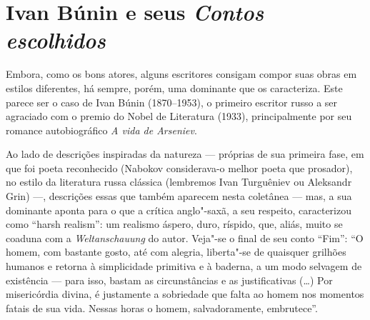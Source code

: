 \chapter{Ivan Búnin e seus \emph{Contos escolhidos}}

Embora, como os bons atores, alguns escritores consigam compor suas obras em estilos diferentes, há sempre, porém, uma dominante que os caracteriza. Este parece ser o caso de Ivan Búnin (1870--1953), o primeiro escritor russo a ser agraciado com o premio do Nobel de Literatura (1933), principalmente por seu romance autobiográfico \emph{A vida de Arseniev}. 

Ao lado de descrições inspiradas da natureza --- próprias de sua primeira fase, em que foi poeta reconhecido (Nabokov considerava-o melhor poeta que prosador), no estilo da literatura russa clássica (lembremos Ivan Turguêniev ou  Aleksandr Grin) ---, descrições  essas  que também aparecem nesta coletânea  --- mas, a sua dominante aponta para o que a crítica anglo"-saxã, a seu respeito, caracterizou como ``harsh realism'': um realismo áspero, duro, ríspido, que, aliás, muito se coaduna com a \emph{Weltanschauung} do autor. Veja"-se o final de seu conto ``Fim'': ``O homem, com bastante gosto, até com alegria, liberta"-se de quaisquer grilhões humanos e retorna à simplicidade primitiva e à baderna, a um modo selvagem de existência --- para isso, bastam as circunstâncias e as justificativas (\ldots{}) Por misericórdia divina, é justamente a sobriedade que falta ao homem nos momentos fatais de sua vida. Nessas horas o homem, salvadoramente, embrutece''.


